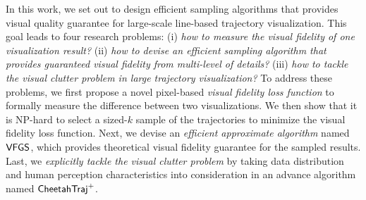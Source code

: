 In this work, we set out to design efficient sampling algorithms that provides visual quality guarantee for large-scale line-based trajectory visualization. This goal leads to four research problems: (i) \emph{how to measure the visual fidelity of one visualization result?} (ii) \emph{how to devise an efficient sampling algorithm that provides guaranteed visual fidelity from multi-level of details?} (iii) \emph{how to tackle the visual clutter problem in large trajectory visualization?} To address these problems, we first propose a novel pixel-based \textit{visual fidelity loss function} to formally measure the difference between two visualizations. We then show that it is NP-hard to select a sized-$k$ sample of the trajectories to minimize the visual fidelity loss function. Next, we devise an \textit{efficient approximate algorithm }named $\mathsf{VFGS}$, which provides theoretical visual fidelity guarantee for the sampled results. Last, we \textit{explicitly tackle the visual clutter problem} by taking data distribution and human perception characteristics into consideration in an advance algorithm named $\mathsf{CheetahTraj}^{+}$.


